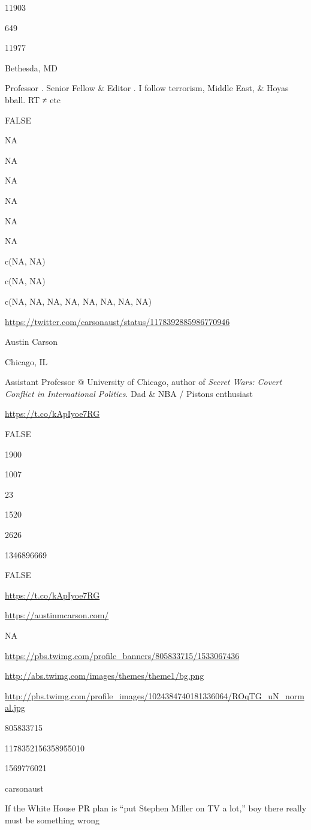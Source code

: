 \documentclass[]{book}
\begin{document}
11903

649

11977

Bethesda, MD

Professor \citet{GeorgetownSFS}. Senior Fellow \citet{BrookingsFP} \&
Editor \citet{lawfareblog}. I follow terrorism, Middle East, \& Hoyas
bball. RT ≠ etc

FALSE

NA

NA

NA

NA

NA

NA

c(NA, NA)

c(NA, NA)

c(NA, NA, NA, NA, NA, NA, NA, NA)

\url{https://twitter.com/carsonaust/status/1178392885986770946}

Austin Carson

Chicago, IL

Assistant Professor @ University of Chicago, author of \emph{Secret
Wars: Covert Conflict in International Politics}. Dad \& NBA / Pistons
enthusiast

\url{https://t.co/kApIyoe7RG}

FALSE

1900

1007

23

1520

2626

1346896669

FALSE

\url{https://t.co/kApIyoe7RG}

\url{https://austinmcarson.com/}

NA

\url{https://pbs.twimg.com/profile_banners/805833715/1533067436}

\url{http://abs.twimg.com/images/themes/theme1/bg.png}

\url{http://pbs.twimg.com/profile_images/1024384740181336064/ROqTG_uN_normal.jpg}

805833715

1178352156358955010

1569776021

carsonaust

If the White House PR plan is ``put Stephen Miller on TV a lot,'' boy
there really must be something wrong
\end{document}

